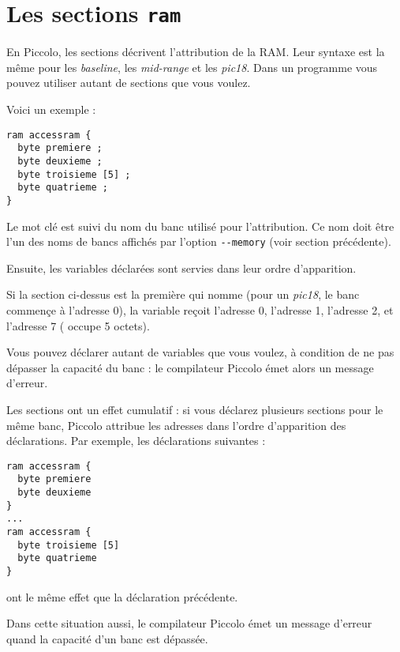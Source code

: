 \section{Les sections \texttt{ram}}

En Piccolo, les sections  décrivent l'attribution de la RAM. Leur syntaxe est la même pour les \emph{baseline}, les \emph{mid-range} et les \emph{pic18}. Dans un programme vous pouvez utiliser autant de sections  que vous voulez.

Voici un exemple :

\begin{lstlisting}[language=piccolo]
ram accessram {
  byte premiere ;
  byte deuxieme ;
  byte troisieme [5] ;
  byte quatrieme ;
}
\end{lstlisting}

Le mot clé  est suivi du nom du banc utilisé pour l'attribution. Ce nom doit être l'un des noms de bancs affichés par l'option \texttt{-{}-memory} (voir section précédente).

Ensuite, les variables déclarées sont servies dans leur ordre d'apparition.

Si la section ci-dessus est la première qui nomme  (pour un \emph{pic18}, le banc  commençe à l'adresse 0), la variable  reçoit l'adresse 0,  l'adresse 1,  l'adresse 2, et  l'adresse 7 ( occupe 5 octets).

Vous pouvez déclarer autant de variables que vous voulez, à condition de ne pas dépasser la capacité du banc : le compilateur Piccolo émet alors un message d'erreur.

Les sections  ont un effet cumulatif : si vous déclarez plusieurs sections pour le même banc, Piccolo attribue les adresses dans l'ordre d'apparition des déclarations. Par exemple, les déclarations suivantes :

\begin{lstlisting}[language=piccolo]
ram accessram {
  byte premiere
  byte deuxieme
}
...
ram accessram {
  byte troisieme [5]
  byte quatrieme
}
\end{lstlisting}

ont le même effet que la déclaration précédente.

Dans cette situation aussi, le compilateur Piccolo émet un message d'erreur quand la capacité d'un banc est dépassée. 



